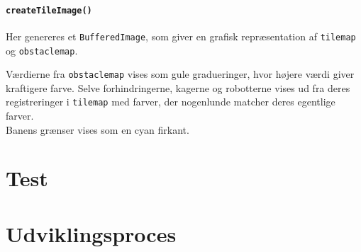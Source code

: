 \paragraph{\texttt{createTileImage()}}
Her genereres et \texttt{BufferedImage}, som giver en grafisk repræsentation af \texttt{tilemap} og \texttt{obstaclemap}.

Værdierne fra \texttt{obstaclemap} vises som gule gradueringer, hvor højere værdi giver kraftigere farve. Selve forhindringerne, kagerne og robotterne vises ud fra deres registreringer i \texttt{tilemap} med farver, der nogenlunde matcher deres egentlige farver.\\
Banens grænser vises som en cyan firkant.
\begin{comment}
Webcam
	mode
	player?
	
Processor
	Thresholds
	Resolution
\end{comment}

\section{Test}

\section{Udviklingsproces}

\begin{comment}
	
Webcam
	Varetager forbindelse til webcam
	Henter BufferedImage i 320x240

Processor
	Billede ind som BufferedImage
	Parse til 2D-array
	Filtrering
	Optimering i walker
	Objekt-/robot ID
	Obstacle map
	Grafisk repræsentation
	Scaling (ej i brug)
	Returnerer Locations objekt til brug i pathfinder
	
Udviklingsproces
	Simpelt udgangspunkt
	Løbende tilføjet funktionalitet med behov fra stifinding
	Efter første full cycle udviklet i version 2 med optimeringer
	
Test
	Program t visuel test
	"Webcam-simulator"
	Benchmark kørsler, resultater
	Performance udvikling
\end{comment}